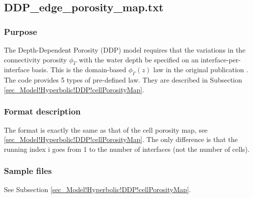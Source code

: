 \subsection{DDP\_edge\_porosity\_map.txt}\label{sec_Model!Hyperbolic!DDP!edgePorosityMap}
\subsubsection{Purpose}
The Depth-Dependent Porosity (DDP) model requires that the variations in the connectivity porosity $\phi_\Gamma$ with the water depth be specified on an interface-per-interface basis. This is the domain-based $\phi_\Gamma(z)$ law in the original publication \cite{Guinot_al_2018}.
The code provides 5 types of pre-defined law. They are described in Subsection \ref{sec_Model!Hyperbolic!DDP!cellPorosityMap}.
%
\subsubsection{Format description}
The format is exactly the same as that of the cell porosity map, see \ref{sec_Model!Hyperbolic!DDP!cellPorosityMap}. The only difference is that the running index i goes from 1 to the number of interfaces (not the number of cells).
\subsubsection{Sample files}
See Subsection \ref{sec_Model!Hyperbolic!DDP!cellPorosityMap}.